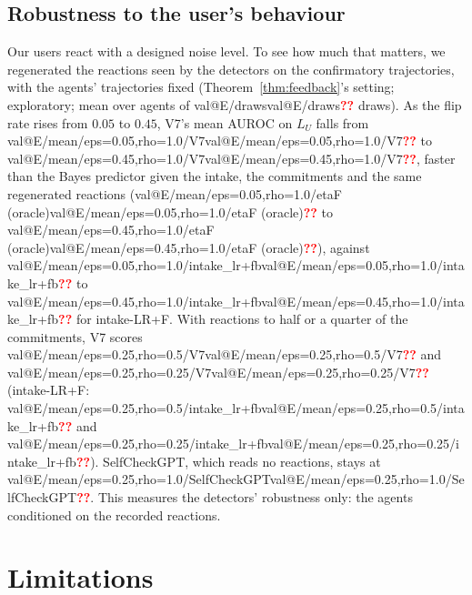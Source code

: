 \documentclass[10pt,a4paper,twocolumn]{article}
\makeatletter
\newcommand{\val}[1]{\ifcsname val@#1\endcsname\csname val@#1\endcsname\else\textcolor{red}{\textbf{??}}\fi}
\newif\iffinal \finaltrue
\newcommand{\chk}[1]{\iffinal#1\else\textcolor{blue}{#1}\fi}
\newcommand{\LU}{L_{U}}
\makeatother
\begin{document}
\subsection{Robustness to the user's behaviour}
\label{sec:exp-robust}

Our users react with a designed noise level. To see how much that matters,
we regenerated the reactions seen by the detectors on the confirmatory
trajectories, with the agents' trajectories fixed (Theorem~\ref{thm:feedback}'s
setting; exploratory; mean over agents of \val{E/draws} draws). \chk{As the
flip rate rises from $0.05$ to $0.45$, V7's mean AUROC on $\LU$ falls from
\val{E/mean/eps=0.05,rho=1.0/V7} to \val{E/mean/eps=0.45,rho=1.0/V7}, faster
than the Bayes predictor given the intake, the commitments and the same
regenerated reactions (\val{E/mean/eps=0.05,rho=1.0/etaF (oracle)} to
\val{E/mean/eps=0.45,rho=1.0/etaF (oracle)}), against
\val{E/mean/eps=0.05,rho=1.0/intake_lr+fb} to
\val{E/mean/eps=0.45,rho=1.0/intake_lr+fb} for intake-LR+F. With reactions to
half or a quarter of the commitments, V7 scores
\val{E/mean/eps=0.25,rho=0.5/V7} and \val{E/mean/eps=0.25,rho=0.25/V7}
(intake-LR+F: \val{E/mean/eps=0.25,rho=0.5/intake_lr+fb} and
\val{E/mean/eps=0.25,rho=0.25/intake_lr+fb}). SelfCheckGPT, which reads no
reactions, stays at \val{E/mean/eps=0.25,rho=1.0/SelfCheckGPT}.} This
measures the detectors' robustness only: the agents conditioned on the
recorded reactions.



\section{Limitations}
\end{document}
